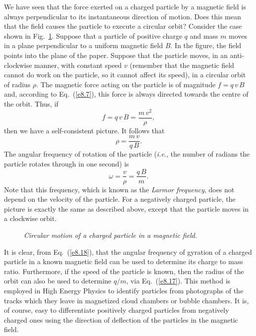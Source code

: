 We have seen that the force exerted on a charged particle by a magnetic
field is always perpendicular to its instantaneous direction of motion.
Does this mean that the field causes the particle to execute a circular
orbit? Consider the case shown in Fig.~\ref{f8.5}. Suppose that a
 particle of positive charge $q$ and mass $m$ moves in a plane perpendicular
to a uniform magnetic field $B$. In the figure, the field points into
the plane of the paper. Suppose that the particle moves, in an
anti-clockwise manner,  with constant
speed $v$ (remember that the magnetic field cannot do work on the
particle, so it cannot affect its speed), in a  circular orbit of radius $\rho$.
The magnetic force acting on the particle is
of magnitude $f=q\,v\,B$ and, according to Eq.~(\ref{e8.7}), this force is always
directed towards the centre of the orbit. Thus, if
\begin{equation}
f = q\,v\,B = \frac{m\,v^2}{\rho},
\end{equation}
then we have a self-consistent picture. It follows that
\begin{equation}\label{e8.17}
\rho = \frac{m\,v}{q\,B}.
\end{equation}
The angular frequency of rotation of the particle ({\em i.e.}, the number of
radians the particle rotates through in one second) is 
\begin{equation}\label{e8.18}
\omega = \frac{v}{\rho} = \frac{q\,B}{m}.
\end{equation}
Note that this frequency, which is known as the {\em Larmor frequency}, does
not depend on the velocity of the particle. For a negatively charged particle,
the picture is exactly the same as described above, except that the particle moves in a
clockwise orbit. 

\begin{figure}
\epsfysize=2.5in
\centerline{}
\caption{\em Circular motion of a charged particle in a magnetic field.}\label{f8.5}
\end{figure}

It is clear, from Eq.~(\ref{e8.18}), that the angular frequency of gyration of a charged
particle in a known magnetic field can be used to determine its charge to
mass ratio. Furthermore, if the speed of the particle is known, then
the radius of the orbit can also be used to determine $q/m$, via Eq.~(\ref{e8.17}).
This method is employed in High Energy Physics to identify particles from
photographs of the tracks which they leave in magnetized cloud chambers or bubble
chambers. It is, of course,  easy to differentiate positively charged particles
from negatively charged ones using the direction of deflection of the
particles in the magnetic field. 

